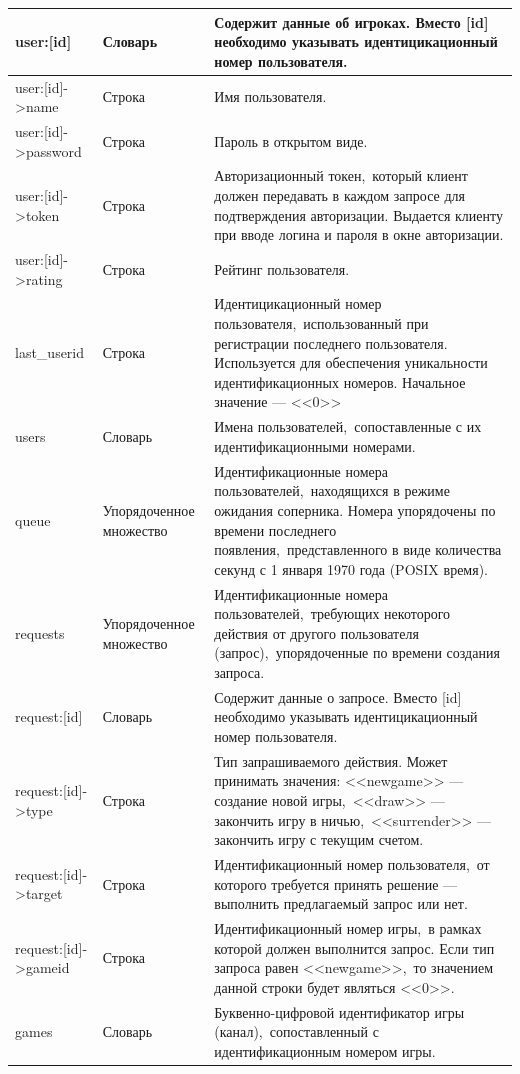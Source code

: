 \documentclass[14pt,a4paper]{report}
\begin{document}
\begin{longtable}{| l | p{3.5cm} | p{6cm} |}
\endhead
user:[id] & Словарь & Содержит данные об игроках. Вместо [id] необходимо указывать идентицикационный номер пользователя.\\*\hline
user:[id]->name & Строка & Имя пользователя.\\*\hline
user:[id]->password & Строка & Пароль в открытом виде.\\*\hline
user:[id]->token & Строка & Авторизационный токен,~который клиент должен передавать в каждом запросе для подтверждения авторизации. Выдается клиенту при вводе логина и пароля в окне авторизации.\\*\hline
user:[id]->rating & Строка & Рейтинг пользователя.\\*\hline
last\_userid & Строка & Идентицикационный номер пользователя,~использованный при регистрации последнего пользователя. Используется для обеспечения уникальности идентификационных номеров. Начальное значение --- <<0>>\\*\hline
users & Словарь & Имена пользователей,~сопоставленные с их идентификационными номерами.\\*\hline
queue & Упорядоченное множество & Идентификационные номера пользователей,~находящихся в режиме ожидания соперника. Номера упорядочены по времени последнего появления,~представленного в виде количества секунд с 1 января 1970 года (POSIX время).\\*\hline
requests & Упорядоченное множество & Идентификационные номера пользователей,~требующих некоторого действия от другого пользователя (запрос),~упорядоченные по времени создания запроса.\\*\hline
request:[id] & Словарь & Содержит данные о запросе. Вместо [id] необходимо указывать идентицикационный номер пользователя.\\*\hline
request:[id]->type & Строка & Тип запрашиваемого действия. Может принимать значения: <<newgame>> --- создание новой игры,~<<draw>> --- закончить игру в ничью,~<<surrender>> --- закончить игру с текущим счетом.\\*\hline
request:[id]->target & Строка & Идентификационный номер пользователя,~от которого требуется принять решение --- выполнить предлагаемый запрос или нет.\\*\hline
request:[id]->gameid & Строка & Идентификационный номер игры,~в рамках которой должен выполнится запрос. Если тип запроса равен <<newgame>>,~то значением данной строки будет являться <<0>>.\\*\hline
games & Словарь & Буквенно-цифровой идентификатор игры (канал),~сопоставленный с идентификационным номером игры.\\*\hline

\end{longtable}
\end{document}

